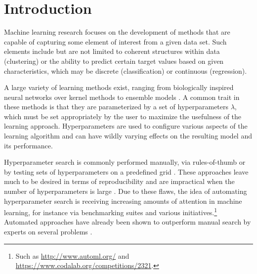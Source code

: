 

\section{Introduction}
Machine learning research focuses on the development of methods that are capable of capturing some element of interest from a given data set. Such elements include but are not limited to coherent structures within data (clustering) or the ability to predict certain target values based on given characteristics, which may be discrete (classification) or continuous (regression). %

A large variety of learning methods exist, ranging from biologically inspired neural networks \citep{bishop1995neural} over kernel methods \citep{scholkopf2002learning} to ensemble models \citep{breiman2001random, ensemblesvm-jmlr}. A common trait in these methods is that they are parameterized by a set of hyperparameters $\lambda$, which must be set appropriately by the user to maximize the usefulness of the learning approach. Hyperparameters are used to configure various aspects of the learning algorithm and can have wildly varying effects on the resulting model and its performance. 

Hyperparameter search is commonly performed manually, via rules-of-thumb \citep{hsu2003practical,hinton2012practical} or by testing sets of hyperparameters on a predefined grid \citep{pedregosa2011scikit}. These approaches leave much to be desired in terms of reproducibility and are impractical when the number of hyperparameters is large \citep{DBLP:journals/corr/ClaesenSPMM14}. Due to these flaws, the idea of automating hyperparameter search is receiving increasing amounts of attention in  machine learning, for instance via benchmarking suites \citep{eggensperger2013towards} and various initiatives.\footnote{Such as \url{http://www.automl.org/} and \url{https://www.codalab.org/competitions/2321}.} %
Automated approaches have already been shown to outperform manual search by experts on several problems \citep{ bergstra2011algorithms,bergstra2012random}. 

